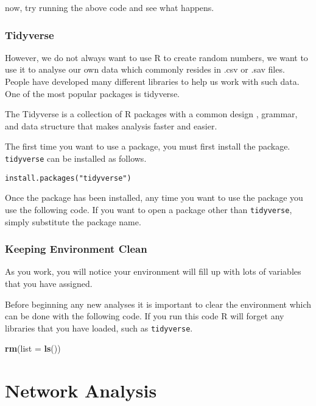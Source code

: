 \documentclass[]{book}
\newenvironment{Shaded}{\begin{snugshade}}{\end{snugshade}}
\newcommand{\KeywordTok}[1]{\textcolor[rgb]{0.13,0.29,0.53}{\textbf{#1}}}
\newcommand{\DataTypeTok}[1]{\textcolor[rgb]{0.13,0.29,0.53}{#1}}
\newcommand{\NormalTok}[1]{#1}
\begin{document}
now, try running the above code and see what happens.

\subsection{Tidyverse}\label{tidyverse}

However, we do not always want to use R to create random numbers, we
want to use it to analyse our own data which commonly resides in .csv or
.sav files. People have developed many different libraries to help us
work with such data. One of the most popular packages is tidyverse.

The Tidyverse is a collection of R packages with a common design ,
grammar, and data structure that makes analysis faster and easier.

The first time you want to use a package, you must first install the
package. \texttt{tidyverse} can be installed as follows.

\begin{verbatim}
install.packages("tidyverse")
\end{verbatim}

Once the package has been installed, any time you want to use the
package you use the following code. If you want to open a package other
than \texttt{tidyverse}, simply substitute the package name.

\subsection{Keeping Environment Clean}\label{keeping-environment-clean}

As you work, you will notice your environment will fill up with lots of
variables that you have assigned.

Before beginning any new analyses it is important to clear the
environment which can be done with the following code. If you run this
code R will forget any libraries that you have loaded, such as
\texttt{tidyverse}.

\begin{Shaded}
\begin{Highlighting}[]
\KeywordTok{rm}\NormalTok{(}\DataTypeTok{list =} \KeywordTok{ls}\NormalTok{())}
\end{Highlighting}
\end{Shaded}

\chapter{Network Analysis}\label{network-analysis}
\end{document}
